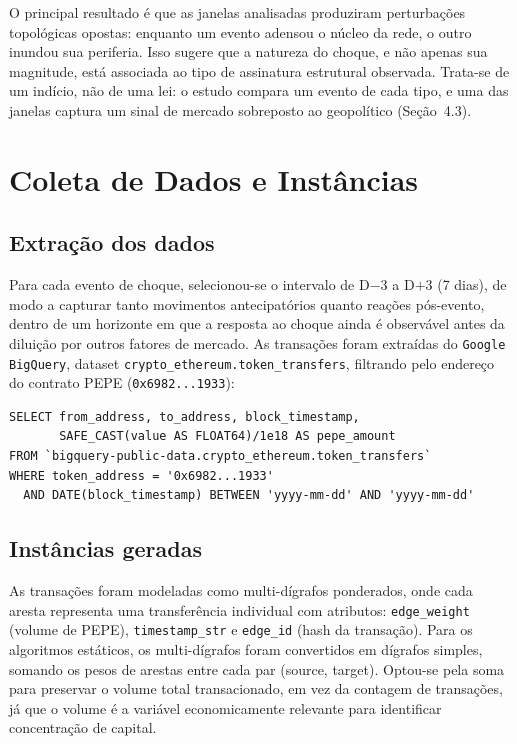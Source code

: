 \documentclass[12pt,a4paper]{article}
\begin{document}
O principal resultado é que as janelas analisadas produziram perturbações topológicas opostas: enquanto um evento adensou o núcleo da rede, o outro inundou sua periferia. Isso sugere que a natureza do choque, e não apenas sua magnitude, está associada ao tipo de assinatura estrutural observada. Trata-se de um indício, não de uma lei: o estudo compara um evento de cada tipo, e uma das janelas captura um sinal de mercado sobreposto ao geopolítico (Seção~4.3).

\section{Coleta de Dados e Instâncias}

\subsection{Extração dos dados}

Para cada evento de choque, selecionou-se o intervalo de D$-$3 a D$+$3 (7 dias), de modo a capturar tanto movimentos antecipatórios quanto reações pós-evento, dentro de um horizonte em que a resposta ao choque ainda é observável antes da diluição por outros fatores de mercado. As transações foram extraídas do \texttt{Google BigQuery}, dataset \texttt{crypto\_ethereum.token\_transfers}, filtrando pelo endereço do contrato PEPE (\texttt{0x6982...1933}):

\begin{verbatim}
SELECT from_address, to_address, block_timestamp,
       SAFE_CAST(value AS FLOAT64)/1e18 AS pepe_amount
FROM `bigquery-public-data.crypto_ethereum.token_transfers`
WHERE token_address = '0x6982...1933'
  AND DATE(block_timestamp) BETWEEN 'yyyy-mm-dd' AND 'yyyy-mm-dd'
\end{verbatim}

\subsection{Instâncias geradas}

As transações foram modeladas como multi-dígrafos ponderados, onde cada aresta representa uma transferência individual com atributos: \texttt{edge\_weight} (volume de PEPE), \texttt{timestamp\_str} e \texttt{edge\_id} (hash da transação). Para os algoritmos estáticos, os multi-dígrafos foram convertidos em dígrafos simples, somando os pesos de arestas entre cada par (source, target). Optou-se pela soma para preservar o volume total transacionado, em vez da contagem de transações, já que o volume é a variável economicamente relevante para identificar concentração de capital.
\end{document}
